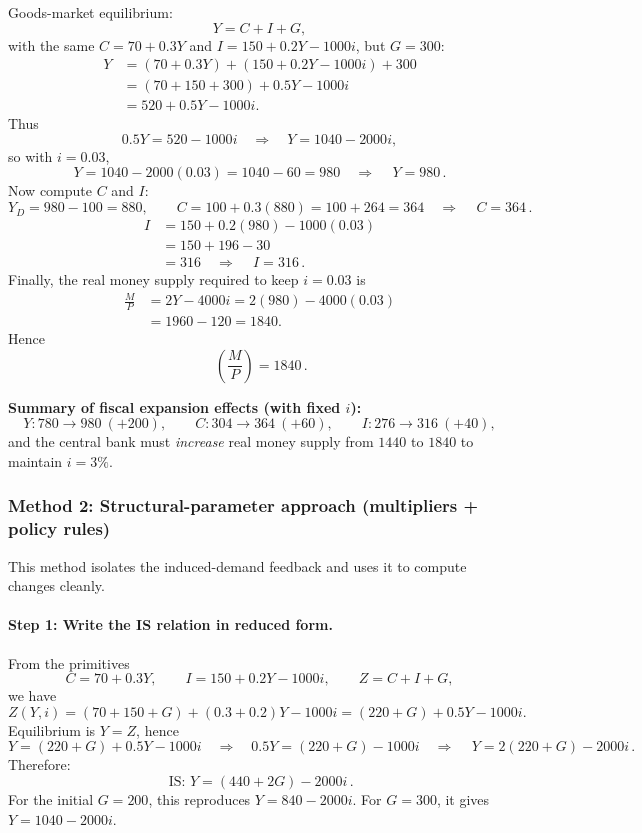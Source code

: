 \documentclass[12pt]{article}
\begin{document}
\begin{enumerate}[label=(\alph*)]
Goods-market equilibrium:
\[
Y = C + I + G,
\]
with the same \(C=70+0.3Y\) and \(I=150+0.2Y-1000i\), but \(G=300\):
\begin{align*}
Y &= (70+0.3Y) + (150+0.2Y-1000i) + 300 \\
  &= (70+150+300) + 0.5Y - 1000i \\
  &= 520 + 0.5Y - 1000i.
\end{align*}
Thus
\[
0.5Y = 520 - 1000i
\quad\Longrightarrow\quad
Y = 1040 - 2000i,
\]
so with \(i=0.03\),
\[
Y = 1040 - 2000(0.03)=1040-60=980
\quad\Rightarrow\quad
\boxed{\,Y=980\, }.
\]
Now compute \(C\) and \(I\):
\[
Y_D=980-100=880,
\qquad
C=100+0.3(880)=100+264=364
\quad\Rightarrow\quad
\boxed{\,C=364\, }.
\]
\begin{align*}
I &= 150 + 0.2(980) - 1000(0.03) \\
  &= 150 + 196 - 30 \\
  &= 316
\quad\Rightarrow\quad
\boxed{\,I=316\, }.
\end{align*}
Finally, the real money supply required to keep \(i=0.03\) is
\begin{align*}
\frac{M}{P}
&=2Y-4000i
=2(980)-4000(0.03) \\
&=1960-120
=1840.
\end{align*}
Hence
\[
\boxed{\,\left(\frac{M}{P}\right)=1840\, }.
\]

\textbf{Summary of fiscal expansion effects (with fixed \(i\)):}
\[
Y: 780\to 980\ (+200),\qquad
C: 304\to 364\ (+60),\qquad
I: 276\to 316\ (+40),
\]
and the central bank must \emph{increase} real money supply from \(1440\) to \(1840\) to maintain \(i=3\%\).
\end{enumerate}

\subsubsection*{Method 2: Structural-parameter approach (multipliers + policy rules)}
This method isolates the induced-demand feedback and uses it to compute changes cleanly.

\paragraph{Step 1: Write the IS relation in reduced form.}
From the primitives
\[
C=70+0.3Y,\qquad I=150+0.2Y-1000i,\qquad Z=C+I+G,
\]
we have
\[
Z(Y,i)= (70+150+G) + (0.3+0.2)Y - 1000i
= (220+G) + 0.5Y - 1000i.
\]
Equilibrium is \(Y=Z\), hence
\[
Y = (220+G) + 0.5Y - 1000i
\quad\Longrightarrow\quad
0.5Y = (220+G) - 1000i
\quad\Longrightarrow\quad
\boxed{\,Y = 2(220+G) - 2000i\, }.
\]
Therefore:
\[
\boxed{\,\text{IS: } Y = (440+2G) - 2000i\, }.
\]
For the initial \(G=200\), this reproduces \(Y=840-2000i\). For \(G=300\), it gives \(Y=1040-2000i\).
\end{document}
